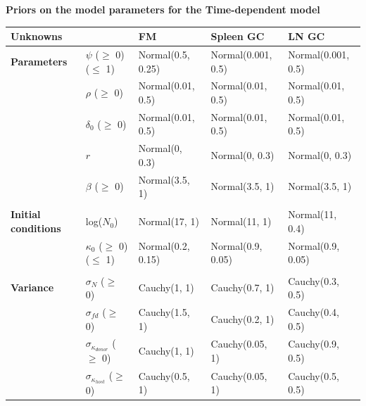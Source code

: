 \documentclass[11pt]{article}
\begin{document}
\begin{table}[h!]
	\begin{center}
		\textbf{Priors on the model parameters for the Time-dependent model}\\
		\renewcommand{\arraystretch}{1.2}
		\begin{tabular}{l l l l l } 
			\toprule 
			\textbf{Unknowns}              &                                     & \textbf{FM}           & \textbf{Spleen GC}        &  \textbf{LN GC}        \\ 
			\toprule
			\textbf{Parameters}            &$\psi$ ($\ge$ 0) ($\le$ 1)           & Normal(0.5, 0.25)     & Normal(0.001, 0.5)   &  Normal(0.001, 0.5)   \\ 			                               
			&$\rho$ ($\ge$ 0)                     & Normal(0.01, 0.5)       & Normal(0.01, 0.5)    &  Normal(0.01, 0.5)    \\
			&$\delta_0$ ($\ge$ 0)                 & Normal(0.01, 0.5)       & Normal(0.01, 0.5)    &  Normal(0.01, 0.5)    \\
			&$r   $                               & Normal(0, 0.3)          & Normal(0, 0.3)       &  Normal(0, 0.3)       \\
			&$\beta$ ($\ge$ 0)                    & Normal(3.5, 1)          & Normal(3.5, 1)       &  Normal(3.5, 1)       \\
			&&&&\\
			\textbf{Initial conditions}    &log($N_0$)                           & Normal(17, 1)         & Normal(11, 1)        &  Normal(11, 0.4)      \\			                               
			&$\kappa_0$ ($\ge$ 0) ($\le$ 1)       & Normal(0.2, 0.15)     & Normal(0.9, 0.05)    &  Normal(0.9, 0.05)    \\
			&&&&\\
			\textbf{Variance}              &$\sigma_N$ ($\ge$ 0)                 & Cauchy(1, 1)          & Cauchy(0.7, 1)       &  Cauchy(0.3, 0.5)     \\ 
			&$\sigma_{fd}$ ($\ge$ 0)              & Cauchy(1.5, 1)        & Cauchy(0.2, 1)       &  Cauchy(0.4, 0.5)     \\
			&$\sigma_{\kappa_{donor}}$ ($\ge$ 0)  & Cauchy(1, 1)          & Cauchy(0.05, 1)      &  Cauchy(0.9, 0.5)     \\ 
			&$\sigma_{\kappa_{host}}$ ($\ge$ 0)   & Cauchy(0.5, 1)        & Cauchy(0.05, 1)      &  Cauchy(0.5, 0.5)     \\
			\hline
			\toprule 
		\end{tabular}
	\end{center}
	\label{tab:priors_tdm}
\end{table} 
\end{document}
